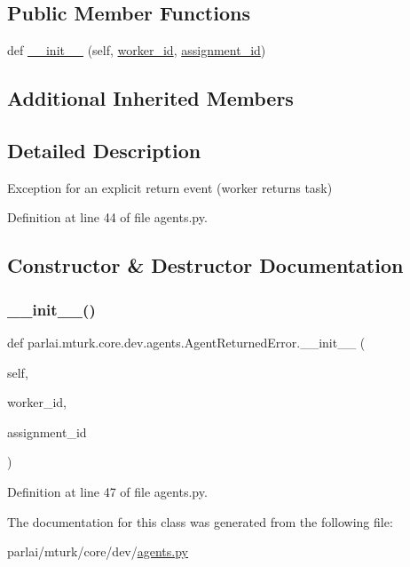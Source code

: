 \subsection*{Public Member Functions}
\begin{DoxyCompactItemize}
\item 
def \hyperlink{classparlai_1_1mturk_1_1core_1_1dev_1_1agents_1_1AgentReturnedError_a95885f02dee5d24bdff9b82f90730061}{\+\_\+\+\_\+init\+\_\+\+\_\+} (self, \hyperlink{classparlai_1_1mturk_1_1core_1_1dev_1_1agents_1_1AbsentAgentError_a26db50c87a5d4954907d538de3da875c}{worker\+\_\+id}, \hyperlink{classparlai_1_1mturk_1_1core_1_1dev_1_1agents_1_1AbsentAgentError_ab9cf020196d28024b307c41a3fff6be1}{assignment\+\_\+id})
\end{DoxyCompactItemize}
\subsection*{Additional Inherited Members}


\subsection{Detailed Description}
\begin{DoxyVerb}Exception for an explicit return event (worker returns task)\end{DoxyVerb}
 

Definition at line 44 of file agents.\+py.



\subsection{Constructor \& Destructor Documentation}
\mbox{\label{classparlai_1_1mturk_1_1core_1_1dev_1_1agents_1_1AgentReturnedError_a95885f02dee5d24bdff9b82f90730061}} 
\subsubsection{\texorpdfstring{\+\_\+\+\_\+init\+\_\+\+\_\+()}{\_\_init\_\_()}}
{\footnotesize\ttfamily def parlai.\+mturk.\+core.\+dev.\+agents.\+Agent\+Returned\+Error.\+\_\+\+\_\+init\+\_\+\+\_\+ (\begin{DoxyParamCaption}\item[{}]{self,  }\item[{}]{worker\+\_\+id,  }\item[{}]{assignment\+\_\+id }\end{DoxyParamCaption})}



Definition at line 47 of file agents.\+py.



The documentation for this class was generated from the following file\+:\begin{DoxyCompactItemize}
\item 
parlai/mturk/core/dev/\hyperlink{parlai_2mturk_2core_2dev_2agents_8py}{agents.\+py}\end{DoxyCompactItemize}

